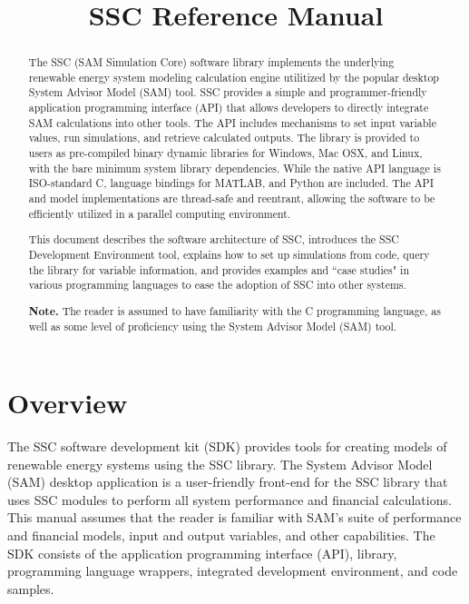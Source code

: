 \documentclass{article}
\title{SSC Reference Manual}
\begin{document}
\maketitle
\vspace{2.5in}
\begin{abstract}
The SSC (SAM Simulation Core) software library implements the underlying renewable energy system modeling calculation engine utilitized by the popular desktop System Advisor Model (SAM) tool.  SSC provides a simple and programmer-friendly application programming interface (API) that allows developers to directly integrate SAM calculations into other tools.  The API includes mechanisms to set input variable values, run simulations, and retrieve calculated outputs.  The library is provided to users as pre-compiled binary dynamic libraries for Windows, Mac OSX, and Linux, with the bare minimum system library dependencies.  While the native API language is ISO-standard C, language bindings for MATLAB, and Python are included.  The API and model implementations are thread-safe and reentrant, allowing the software to be efficiently utilized in a parallel computing environment.

This document describes the software architecture of SSC, introduces the SSC Development Environment tool, explains how to set up simulations from code, query the library for variable information, and provides examples and ``case studies" in various programming languages to ease the adoption of SSC into other systems.  

\textbf{Note.} The reader is assumed to have familiarity with the C programming language, as well as some level of proficiency using the System Advisor Model (SAM) tool.
\end{abstract} 

\newpage
\tableofcontents
\newpage

\section{Overview}
\label{sec_overview}

The SSC software development kit (SDK) provides tools for creating models of renewable energy systems using the SSC library. The System Advisor Model (SAM) desktop application is a user-friendly front-end for the SSC library that uses SSC modules to perform all system performance and financial calculations. This manual assumes that the reader is familiar with SAM's suite of performance and financial models, input and output variables, and other capabilities. The SDK consists of the application programming interface (API), library, programming language wrappers, integrated development environment, and code samples.
\end{document}
